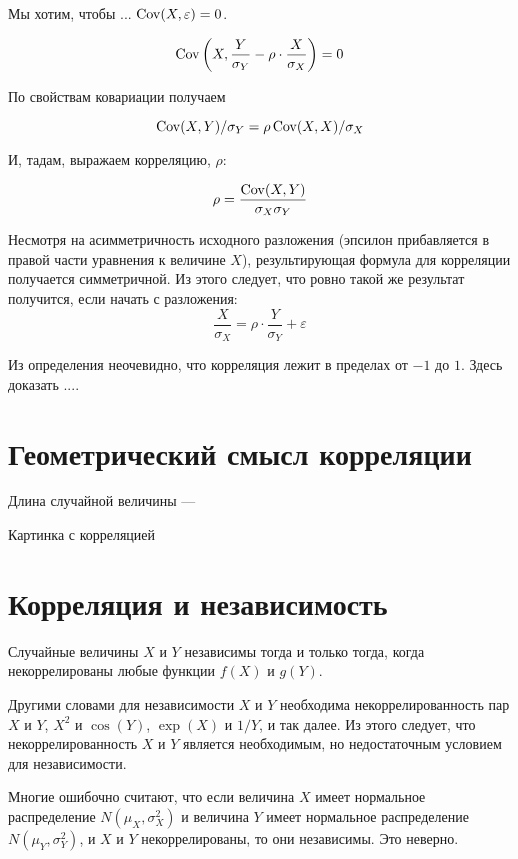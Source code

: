 \documentclass[10pt]{article}
\begin{document}
%

Мы хотим, чтобы ... $\operatorname{Cov}(X,\varepsilon)=0$. 


\[
\operatorname{Cov}\left(X, \frac{Y}{\sigma_Y} - \rho \cdot \frac{X}{\sigma_X} \right) = 0
\]

По свойствам ковариации получаем

\[
\operatorname{Cov}(X,Y)/\sigma_Y=\rho \operatorname{Cov}(X,X)/\sigma_X
\]

И, тадам, выражаем корреляцию, $\rho$:

\[
\rho = \frac{\operatorname{Cov}(X,Y)}{\sigma_X \sigma_Y}
\]

Несмотря на асимметричность исходного разложения (эпсилон прибавляется в правой части уравнения к величине $X$), результирующая формула для корреляции получается симметричной. Из этого следует, что ровно такой же результат получится, если начать с разложения:
\[
\frac{X}{\sigma_X}=\rho \cdot \frac{Y}{\sigma_Y} + \varepsilon
\]

Из определения неочевидно, что корреляция лежит в пределах от $-1$ до $1$. Здесь доказать ....



\section{Геометрический смысл корреляции}

Длина случайной величины --- 

Картинка с корреляцией

\section{Корреляция и независимость}

\begin{theorem}
Случайные величины $X$ и $Y$ независимы тогда и только тогда, когда некоррелированы любые функции $f(X)$ и $g(Y)$.
\end{theorem}

Другими словами для независимости $X$ и $Y$ необходима некоррелированность пар $X$ и $Y$, $X^2$ и $\cos(Y)$, $\exp(X)$ и $1/Y$, и так далее. Из этого следует, что некоррелированность $X$ и $Y$ является необходимым, но недостаточным условием для независимости.

Многие ошибочно считают, что если величина $X$ имеет нормальное распределение $N(\mu_X, \sigma^2_X)$ и величина $Y$ имеет нормальное распределение $N(\mu_Y, \sigma^2_Y)$, и $X$ и $Y$ некоррелированы, то они независимы. Это неверно.
\end{document}
